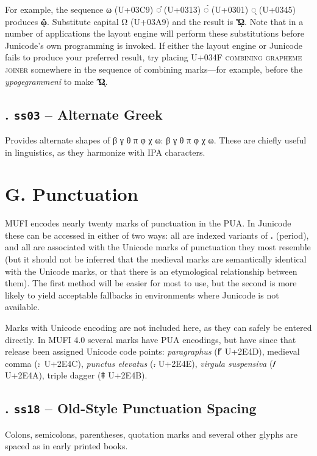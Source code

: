 \documentclass[12pt,letterpaper,openany]{book}
\newcommand\textLetterExample[1]{\textrm{\textbf{\color{BrickRed}#1}}}
\newcommand\textUName[1]{\textsc{#1}}
\newcommand\textSourceText[1]{{\color{GGOrange}\texttt{#1}}}
\newcounter{Feature}
\renewcommand\theFeature{\arabic{Feature}}
\begin{document}
For example, the sequence ω (U+03C9) ◌̓ (U+0313) ◌́ (U+0301) ◌ͅ (U+0345)
produces \textLetterExample{ᾤ}. Substitute capital Ω (U+03A9) and the result is
\textLetterExample{ᾬ}. Note that in a number of applications the layout
engine will perform these substitutions before Junicode’s own programming is
invoked. If either the layout engine or Junicode fails to produce your
preferred result, try placing U+034F \textUName{combining grapheme joiner} somewhere
in the sequence of combining marks---for example, before the \textit{ypogegrammeni}
to make \textLetterExample{Ὤ͏ͅ}.

\subsection[26. ss03 {}-- Alternate Greek]{\stepcounter{Feature}{\theFeature}.
\textSourceText{ss03} -- Alternate Greek}
Provides alternate shapes of β γ θ π φ χ ω: {β γ θ π φ χ ω}.
These are chiefly useful in linguistics, as they harmonize with IPA characters.

\hypertarget{SectionG}{}\section{G. Punctuation}
MUFI encodes nearly twenty marks of punctuation in the PUA. In Junicode these can be accessed in
either of two ways: all are indexed variants of \textLetterExample{.} (period), and all are associated with the Unicode marks of
punctuation they most resemble (but it should not be inferred that the medieval marks are semantically identical with
the Unicode marks, or that there is an etymological relationship between them). The first method will be easier for
most to use, but the second is more likely to yield acceptable fallbacks in environments where Junicode is not
available.

Marks with Unicode encoding are not included here, as they can safely be entered directly. In MUFI 4.0 several marks
have PUA encodings, but have since that release been assigned Unicode code points: \textit{paragraphus} (⹍
U+2E4D), medieval comma (⹌~U+2E4C), \textit{punctus elevatus} (⹎ U+2E4E), \textit{virgula suspensiva}
(⹊ U+2E4A), triple dagger (⹋ U+2E4B).

\subsection[27. ss18 {}-- Old{}-Style Punctuation Spacing]{\stepcounter{Feature}{\theFeature}.
\textSourceText{ss18} -- Old-Style Punctuation Spacing}
Colons, semicolons, parentheses, quotation marks and several other glyphs are spaced as in early printed books.
\end{document}
